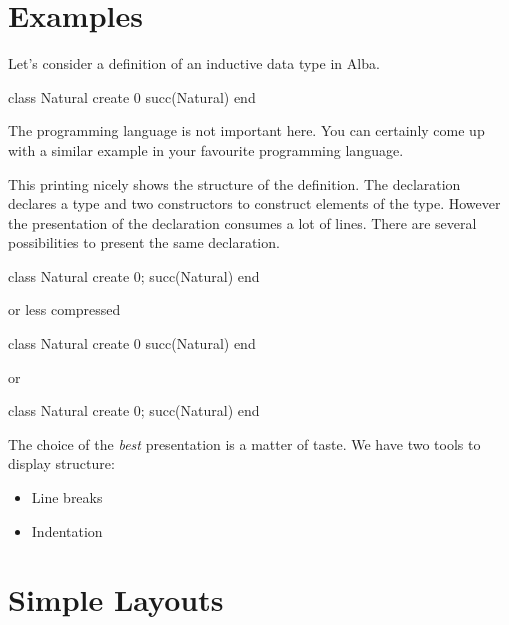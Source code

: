\documentclass[12pt]{article}
\begin{document}
\section{Examples}


Let's consider a definition of an inductive data type in Alba.
\begin{alba}
    class
        Natural
    create
        0
        succ(Natural)
    end
\end{alba}
%
The programming language is not important here. You can certainly come up with
a similar example in your favourite programming language.

This printing nicely shows the structure of the definition. The declaration
declares a type and two constructors to construct elements of the
type. However the presentation of the declaration consumes a lot of lines.
There are several possibilities to present the same declaration.
%
\begin{alba}
    class Natural create 0; succ(Natural) end
\end{alba}
%
or less compressed
\begin{alba}
    class Natural create
        0
        succ(Natural)
    end
\end{alba}
%
or
%
\begin{alba}
    class Natural create
        0; succ(Natural)
    end
\end{alba}
%
%
The choice of the \emph{best} presentation is a matter of taste.  We have two
tools to display structure:
\begin{itemize}
\item Line breaks
\item Indentation
\end{itemize}









\section{Simple Layouts}
\end{document}
